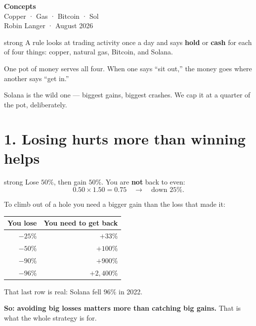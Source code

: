 \documentclass[12pt,a4paper]{article}
\begin{document}
\begin{center}
\vspace*{0.5cm}
{\Huge\bfseries\color{accent} Concepts}\\[0.8em]
{\Large Copper · Gas · Bitcoin · Sol}\\[1.5em]
{\small Robin Langer · August 2026}
\end{center}

\vspace{0.8em}

\begin{kbox}{strong}
A rule looks at trading activity once a day and says \textbf{hold} or
\textbf{cash} for each of four things: copper, natural gas, Bitcoin,
and Solana.

\vspace{0.7em}
One pot of money serves all four. When one says ``sit out,'' the money
goes where another says ``get in.''

\vspace{0.7em}
Solana is the wild one --- biggest gains, biggest crashes. We cap it at
a quarter of the pot, deliberately.
\end{kbox}

\section{1. Losing hurts more than winning helps}

\begin{kbox}{strong}
Lose $50\%$, then gain $50\%$. You are \textbf{not} back to even:
\[
    0.50 \times 1.50 = 0.75 \quad\longrightarrow\quad \text{down } 25\%.
\]

\vspace{0.3em}
To climb out of a hole you need a bigger gain than the loss that made it:

\vspace{0.4em}
\centering
\begin{tabular}{@{}rr@{}}
    \toprule
    \textbf{You lose} & \textbf{You need to get back} \\
    \midrule
    $-25\%$ & $+33\%$ \\
    $-50\%$ & $+100\%$ \\
    $-90\%$ & $+900\%$ \\
    $-96\%$ & $+2{,}400\%$ \\
    \bottomrule
\end{tabular}

\vspace{0.5em}
\raggedright
That last row is real: Solana fell $96\%$ in 2022.

\vspace{0.4em}
\textbf{So: avoiding big losses matters more than catching big gains.}
That is what the whole strategy is for.
\end{kbox}
\end{document}
